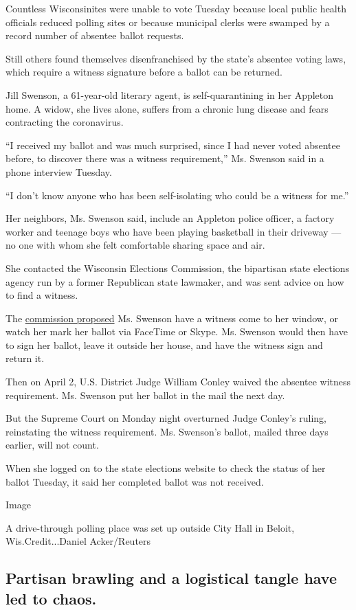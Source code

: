 Countless Wisconsinites were unable to vote Tuesday because local public
health officials reduced polling sites or because municipal clerks were
swamped by a record number of absentee ballot requests.

Still others found themselves disenfranchised by the state's absentee
voting laws, which require a witness signature before a ballot can be
returned.

Jill Swenson, a 61-year-old literary agent, is self-quarantining in her
Appleton home. A widow, she lives alone, suffers from a chronic lung
disease and fears contracting the coronavirus.

``I received my ballot and was much surprised, since I had never voted
absentee before, to discover there was a witness requirement,'' Ms.
Swenson said in a phone interview Tuesday.

``I don't know anyone who has been self-isolating who could be a witness
for me.''

Her neighbors, Ms. Swenson said, include an Appleton police officer, a
factory worker and teenage boys who have been playing basketball in
their driveway --- no one with whom she felt comfortable sharing space
and air.

She contacted the Wisconsin Elections Commission, the bipartisan state
elections agency run by a former Republican state lawmaker, and was sent
advice on how to find a witness.

The \href{https://elections.wi.gov/node/6790}{commission proposed} Ms.
Swenson have a witness come to her window, or watch her mark her ballot
via FaceTime or Skype. Ms. Swenson would then have to sign her ballot,
leave it outside her house, and have the witness sign and return it.

Then on April 2, U.S. District Judge William Conley waived the absentee
witness requirement. Ms. Swenson put her ballot in the mail the next
day.

But the Supreme Court on Monday night overturned Judge Conley's ruling,
reinstating the witness requirement. Ms. Swenson's ballot, mailed three
days earlier, will not count.

When she logged on to the state elections website to check the status of
her ballot Tuesday, it said her completed ballot was not received.

Image

A drive-through polling place was set up outside City Hall in Beloit,
Wis.Credit...Daniel Acker/Reuters

\hypertarget{partisan-brawling-and-a-logistical-tangle-have-led-to-chaos}{%
\subsection{Partisan brawling and a logistical tangle have led to
chaos.}\label{partisan-brawling-and-a-logistical-tangle-have-led-to-chaos}}

